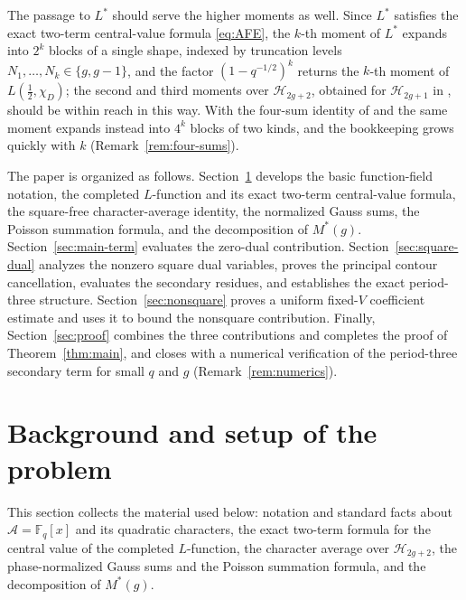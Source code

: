 \documentclass[a4paper,reqno]{amsart}
\numberwithin{equation}{section}
\theoremstyle{remark}
\theoremstyle{definition}
\newcommand{\A}{\mathcal{A}}
\begin{document}
The passage to $L^*$ should serve the higher moments as well. Since $L^*$
satisfies the exact two-term central-value formula \eqref{eq:AFE}, the
$k$-th moment of $L^*$ expands into $2^k$ blocks of a single shape, indexed
by truncation levels $N_1,\dots,N_k\in\{g,g-1\}$, and the factor
$(1-q^{-1/2})^k$ returns the $k$-th moment of
$L\!\left(\tfrac12,\chi_D\right)$; the second and third moments over
$\mathcal H_{2g+2}$, obtained for $\mathcal H_{2g+1}$ in \cite{Fl17-2},
should be within reach in this way. With the four-sum identity of
\cite[Lemma~2.1]{Ju20} and \cite[Lemma~2.4]{AM-21} the same moment expands
instead into $4^k$ blocks of two kinds, and the bookkeeping grows quickly
with $k$ (Remark~\ref{rem:four-sums}).

The paper is organized as follows. Section~\ref{sec:setup} develops
the basic function-field notation, the completed $L$-function and
its exact two-term central-value formula, the square-free
character-average identity, the normalized Gauss sums, the Poisson
summation formula, and the decomposition of $M^*(g)$.
Section~\ref{sec:main-term} evaluates the zero-dual contribution.
Section~\ref{sec:square-dual} analyzes the nonzero square dual
variables, proves the principal contour cancellation, evaluates the
secondary residues, and establishes the exact period-three
structure. Section~\ref{sec:nonsquare} proves a uniform fixed-$V$
coefficient estimate and uses it to bound the nonsquare contribution.
Finally, Section~\ref{sec:proof} combines the three contributions and
completes the proof of Theorem~\ref{thm:main}, and closes with a numerical
verification of the period-three secondary term for small $q$ and $g$
(Remark~\ref{rem:numerics}).


\section{Background and setup of the problem}\label{sec:setup}

This section collects the material used below: notation and standard facts
about $\A=\mathbb F_q[x]$ and its quadratic characters, the exact two-term
formula for the central value of the completed $L$-function, the character
average over $\mathcal H_{2g+2}$, the phase-normalized Gauss sums and the
Poisson summation formula, and the decomposition of $M^*(g)$.
\end{document}
